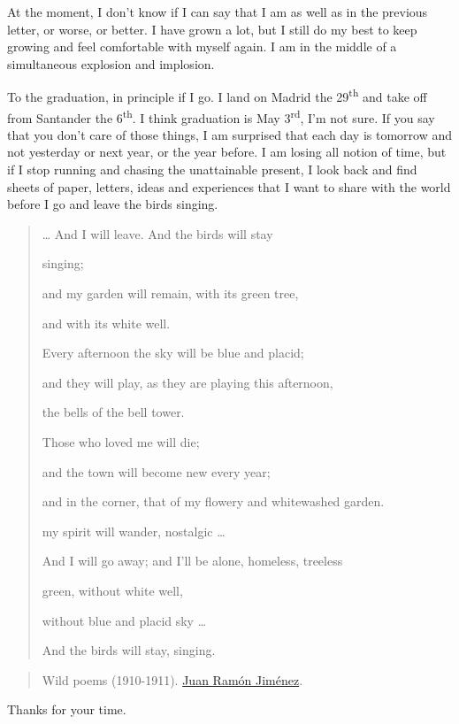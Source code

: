 \documentclass[]{book}
\begin{document}
At the moment, I don't know if I can say that I am as well as in the previous letter, or worse, or better. I have grown a lot, but I still do my best to keep growing and feel comfortable with myself again. I am in the middle of a simultaneous explosion and implosion.

To the graduation, in principle if I go. I land on Madrid the 29\textsuperscript{th} and take off from Santander the 6\textsuperscript{th}. I think graduation is May 3\textsuperscript{rd}, I'm not sure. If you say that you don't care of those things, I am surprised that each day is tomorrow and not yesterday or next year, or the year before. I am losing all notion of time, but if I stop running and chasing the unattainable present, I look back and find sheets of paper, letters, ideas and experiences that I want to share with the world before I go and leave the birds singing.

\begin{quote}
\ldots{} And I will leave. And the birds will stay

singing;

and my garden will remain, with its green tree,

and with its white well.

Every afternoon the sky will be blue and placid;

and they will play, as they are playing this afternoon,

the bells of the bell tower.

Those who loved me will die;

and the town will become new every year;

and in the corner, that of my flowery and whitewashed garden.

my spirit will wander, nostalgic \ldots{}

And I will go away; and I'll be alone, homeless, treeless

green, without white well,

without blue and placid sky \ldots{}

And the birds will stay, singing.
\end{quote}

\begin{quote}
Wild poems (1910-1911). \href{https://en.wikipedia.org/wiki/Juan_Ram\%C3\%B3n_Jim\%C3\%A9nez}{Juan Ramón Jiménez}. \citep{jimenez1970tercera}
\end{quote}

Thanks for your time.
\end{document}
